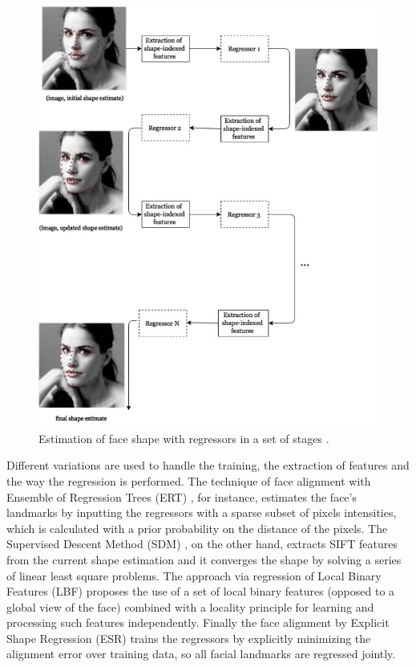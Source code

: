 \begin{figure}[h]
    \centering
    \includegraphics[width=0.9\linewidth]{figures/cascade-explanation.jpg}
    \caption{Estimation of face shape with regressors in a set of stages \parencite{maris2015}.}
    \label{fig:regressor-steps}
\end{figure}

Different variations are used to handle the training, the extraction of features and the way the regression is performed. The technique of face alignment with Ensemble of Regression Trees (ERT) \parencite{kazemi2014one}, for instance, estimates the face's landmarks by inputting the regressors with a sparse subset of pixels intensities, which is calculated with a prior probability on the distance of the pixels. The Supervised Descent Method (SDM) \parencite{xiong2013supervised}, on the other hand, extracts SIFT features from the current shape estimation and it converges the shape by solving a series of linear least square problems. The approach via regression of Local Binary Features (LBF) \parencite{ren2014face} proposes the use of a set of local binary features (opposed to a global view of the face) combined with a locality principle for learning and processing such features independently. Finally the face alignment by Explicit Shape Regression (ESR) \parencite{cao2014face} trains the regressors by explicitly minimizing the alignment error over training data, so all facial landmarks are regressed jointly.

